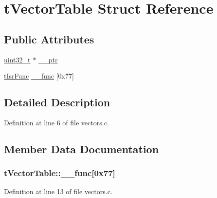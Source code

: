 \hypertarget{structt_vector_table}{}\section{t\+Vector\+Table Struct Reference}
\label{structt_vector_table}
\subsection*{Public Attributes}
\begin{DoxyCompactItemize}
\item 
\hyperlink{_p_e___types_8h_a33594304e786b158f3fb30289278f5af}{uint32\+\_\+t} $\ast$ \hyperlink{structt_vector_table_a131a71eb2af6dfdd25a05f4a62f0b5fa}{\+\_\+\+\_\+ptr}
\item 
\hyperlink{bootloader_2k20_2startup_2vectors_8c_afea04d3e8135767c03ce099f02e97437}{t\+Isr\+Func} \hyperlink{structt_vector_table_ab8b55bb9583cef7b7c4aeced5a69d61f}{\+\_\+\+\_\+func} \mbox{[}0x77\mbox{]}
\end{DoxyCompactItemize}


\subsection{Detailed Description}


Definition at line 6 of file vectors.\+c.



\subsection{Member Data Documentation}
\subsubsection[{\texorpdfstring{\+\_\+\+\_\+func}{__func}}]{ t\+Vector\+Table\+::\+\_\+\+\_\+func\mbox{[}0x77\mbox{]}}\hypertarget{structt_vector_table_ab8b55bb9583cef7b7c4aeced5a69d61f}{}\label{structt_vector_table_ab8b55bb9583cef7b7c4aeced5a69d61f}


Definition at line 13 of file vectors.\+c.

